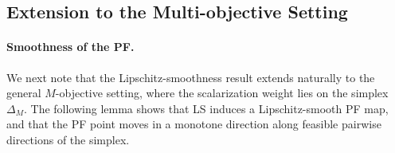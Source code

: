 \documentclass{article}
\begin{document}
\subsection{Extension to the Multi-objective Setting}
\label{app:multi_objective_extension}

\paragraph{Smoothness of the PF.}
We next note that the Lipschitz-smoothness result extends naturally to the general $M$-objective setting, where the scalarization weight lies on the simplex $\Delta_M$. The following lemma shows that LS induces a Lipschitz-smooth PF map, and that the PF point moves in a monotone direction along feasible pairwise directions of the simplex.
\end{document}
